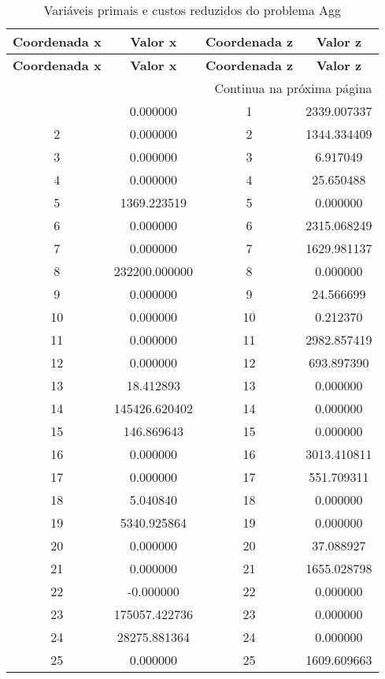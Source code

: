 \documentclass[12pt]{article}
\begin{document}
\begin{longtable}{@{}cccc@{}}
\caption{Variáveis primais e custos reduzidos do problema Agg} \\
\toprule
\textbf{Coordenada x} & \textbf{Valor x} & \textbf{Coordenada z} & \textbf{Valor z} \\
\midrule
\endfirsthead

\toprule
\textbf{Coordenada x} & \textbf{Valor x} & \textbf{Coordenada z} & \textbf{Valor z} \\
\midrule
\endhead

\midrule \multicolumn{4}{r}{{Continua na próxima página}} \\ \midrule
\endfoot

\bottomrule
\endlastfoot
1 & 0.000000 & 1 & 2339.007337 \\
2 & 0.000000 & 2 & 1344.334409 \\
3 & 0.000000 & 3 & 6.917049 \\
4 & 0.000000 & 4 & 25.650488 \\
5 & 1369.223519 & 5 & 0.000000 \\
6 & 0.000000 & 6 & 2315.068249 \\
7 & 0.000000 & 7 & 1629.981137 \\
8 & 232200.000000 & 8 & 0.000000 \\
9 & 0.000000 & 9 & 24.566699 \\
10 & 0.000000 & 10 & 0.212370 \\
11 & 0.000000 & 11 & 2982.857419 \\
12 & 0.000000 & 12 & 693.897390 \\
13 & 18.412893 & 13 & 0.000000 \\
14 & 145426.620402 & 14 & 0.000000 \\
15 & 146.869643 & 15 & 0.000000 \\
16 & 0.000000 & 16 & 3013.410811 \\
17 & 0.000000 & 17 & 551.709311 \\
18 & 5.040840 & 18 & 0.000000 \\
19 & 5340.925864 & 19 & 0.000000 \\
20 & 0.000000 & 20 & 37.088927 \\
21 & 0.000000 & 21 & 1655.028798 \\
22 & -0.000000 & 22 & 0.000000 \\
23 & 175057.422736 & 23 & 0.000000 \\
24 & 28275.881364 & 24 & 0.000000 \\
25 & 0.000000 & 25 & 1609.609663 \\

\end{longtable}
\end{document}
